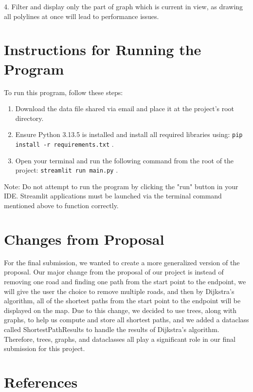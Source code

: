 \documentclass[fontsize=11pt]{article}
\begin{document}
4. Filter and display only the part of graph which is current in view, as drawing all polylines at once will lead to performance issues.

\section*{Instructions for Running the Program}

To run this program, follow these steps:

\begin{enumerate}
    \item Download the data file shared via email and place it at the project's root directory.
    \item Ensure Python 3.13.5 is installed and install all required libraries using: \texttt{pip install -r requirements.txt} .
    \item Open your terminal and run the following command from the root of the project: \texttt{streamlit run main.py} .
\end{enumerate}

Note: Do not attempt to run the program by clicking the "run" button in your IDE. Streamlit applications must be launched via the terminal command mentioned above to function correctly.

\section*{Changes from Proposal}

For the final submission, we wanted to create a more generalized version of the proposal. Our major change from the proposal of our project is instead of removing one road and finding one path from the start point to the endpoint, we will give the user the choice to remove multiple roads, and then by Dijkstra's algorithm, all of the shortest paths from the start point to the endpoint will be displayed on the map. Due to this change, we decided to use trees, along with graphs, to help us compute and store all shortest paths, and we added a dataclass called ShortestPathResults to handle the results of Dijkstra's algorithm. Therefore, trees, graphs, and dataclasses all play a significant role in our final submission for this project.

\section*{References}
\end{document}
